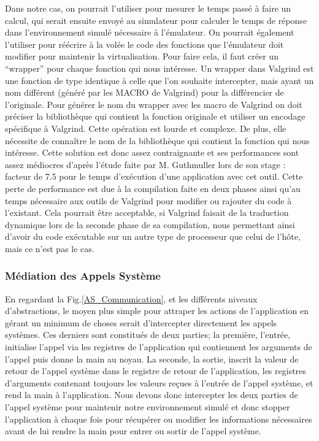 Dans notre cas, on pourrait l'utiliser pour mesurer le temps passé à faire un
calcul, qui serait ensuite envoyé au simulateur pour calculer le temps de
réponse dans l'environnement simulé nécessaire à l'émulateur. On pourrait
également l'utiliser pour réécrire à la volée le code des fonctions que
l'émulateur doit modifier pour maintenir la virtualisation. Pour faire cela, il
faut créer un ``wrapper'' pour chaque fonction qui nous intéresse. Un wrapper
dans Valgrind est une fonction de type identique à celle que l'on souhaite
intercepter, mais ayant un nom différent (généré par les MACRO de Valgrind) pour
la différencier de l'originale. Pour générer le nom du wrapper avec les macro de
Valgrind on doit préciser la bibliothèque qui contient la fonction originale et
utiliser un encodage spécifique à Valgrind. Cette opération est lourde et
complexe. De plus, elle nécessite de connaître le nom de la bibliothèque qui
contient la fonction qui nous intéresse. Cette solution est donc assez
contraignante et ses performances sont assez médiocres d'après l'étude faite par
M. Guthmuller lors de son stage \cite{INTERCEPTION:MARION}: facteur de 7.5 pour
le temps d'exécution d'une application avec cet outil. Cette perte de
performance est due à la compilation faite en deux phases ainsi qu'au temps
nécessaire aux outils de Valgrind pour modifier ou rajouter du code à
l'existant. Cela pourrait être acceptable, si Valgrind faisait de la traduction
dynamique lors de la seconde phase de sa compilation, nous permettant ainsi
d'avoir du code exécutable sur un autre type de processeur que celui de l'hôte,
mais ce n'est pas le cas.

\subsubsection{Médiation des Appels Système}

En regardant la Fig.\ref{AS_Communication}, et les différents niveaux
d'abstractions, le moyen plus simple pour attraper les actions de l'application
en gérant un minimum de choses serait d'intercepter directement les appels
systèmes.  Ces derniers sont constitués de deux parties; la première, l'entrée,
initialise l'appel via les registres de l'application qui contiennent les
arguments de l'appel puis donne la main au noyau. La seconde, la sortie, inscrit
la valeur de retour de l'appel système dans le registre de retour de
l'application, les registres d'arguments contenant toujours les valeurs reçues à
l'entrée de l'appel système, et rend la main à l'application. Nous devons donc
intercepter les deux parties de l'appel système pour maintenir notre
environnement simulé et donc stopper l'application à chaque fois pour récupérer
ou modifier les informations nécessaires avant de lui rendre la main pour entrer
ou sortir de l'appel système.

